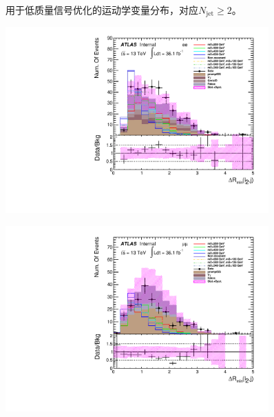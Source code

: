 \begin{figure}[h]
\begin{minipage}[t]{0.33\linewidth}
 \end{minipage}
 \caption{用于低质量信号优化的运动学变量分布，对应$N_{\text{jet}}\geq2$。}
\label{fig:SigOpt_low_kine}
\end{figure}

\begin{figure}[h]
 \begin{minipage}[t]{0.33\linewidth}
 \centering
 \includegraphics[width=0.9\textwidth,angle=-90]{fig/dataMC_high_Njet_CR/mindR_l2j_ee.pdf}\label{fig:dataMC_high_Njet_CR:mindRl2j_ee.pdf}
 \end{minipage}
 \begin{minipage}[t]{0.33\linewidth}
 \centering
 \includegraphics[width=0.9\textwidth,angle=-90]{fig/dataMC_high_Njet_CR/mindR_l2j_mumu.pdf}\label{fig:dataMC_high_Njet_CR:mindRl2j_mumu.pdf}

\end{minipage}
\end{figure}
